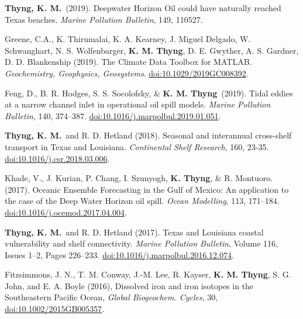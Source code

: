 \documentclass[10pt,letterpaper]{article}
\newcommand{\kmt}{\textbf{K. M. Thyng}}
\newcommand{\tkm}{\textbf{Thyng, K. M.}}
\newcommand{\kt}{\textbf{K. Thyng}}
\renewenvironment{itemize}{
  \begin{list}{}{
    \setlength{\leftmargin}{1.5em}
    \setlength{\itemsep}{0.25em}
    \setlength{\parskip}{0pt}
    \setlength{\parsep}{0.25em}
  }
}{
  \end{list}
}
\begin{document}
\begin{itemize}
\item \tkm~(2019). Deepwater Horizon Oil could have naturally reached Texas beaches. \textit{Marine Pollution Bulletin}, 149, 110527.

\item Greene, C.A.,  K. Thirumalai,  K. A. Kearney,  J. Miguel Delgado,  W. Schwanghart,  N. S. Wolfenbarger,  \kmt,  D. E. Gwyther,  A. S. Gardner,  D. D. Blankenship (2019). The Climate Data Toolbox for MATLAB.  \textit{Geochemistry, Geophysics, Geosystems}. \href{https://agupubs.onlinelibrary.wiley.com/doi/abs/10.1029/2019GC008392}{doi:10.1029/2019GC008392}.

\item Feng, D., B. R. Hodges, S. S. Socolofsky, \& \kmt~(2019). Tidal eddies at a narrow channel inlet in operational oil spill models.  \textit{Marine Pollution Bulletin}, 140, 374--387. \href{https://www.sciencedirect.com/science/article/pii/S0025326X19300712?via%3Dihub}{doi:10.1016/j.marpolbul.2019.01.051}.

\item \tkm~and R. D. Hetland (2018). Seasonal and interannual cross-shelf transport in Texas and Louisiana. \textit{Continental Shelf Research}, 160, 23-35. \href{https://www.sciencedirect.com/science/article/pii/S0278434317302509}{doi:10.1016/j.csr.2018.03.006}.

\item Khade, V., J. Kurian, P. Chang, I. Szunyogh, \kt, \& R. Montuoro. (2017). Oceanic Ensemble Forecasting in the Gulf of Mexico: An application to the case of the Deep Water Horizon oil spill. \textit{Ocean Modelling}, 113, 171--184.  \href{http://www.sciencedirect.com/science/article/pii/S1463500317300525}{doi:10.1016/j.ocemod.2017.04.004}.

\item \tkm~and R. D. Hetland (2017). Texas and Louisiana coastal vulnerability and shelf connectivity. \textit{Marine Pollution Bulletin}, Volume 116, Issues 1--2, Pages 226--233. \href{http://www.sciencedirect.com/science/article/pii/S0025326X16310773}{doi:10.1016/j.marpolbul.2016.12.074}.

\item Fitzsimmons, J. N., T. M. Conway, J.-M. Lee, R. Kayser, \kmt, S. G. John, and E. A. Boyle (2016), Dissolved iron and iron isotopes in the Southeastern Pacific Ocean, \textit{Global Biogeochem. Cycles}, 30,\\ \href{http://onlinelibrary.wiley.com/doi/10.1002/2015GB005357/full}{doi:10.1002/2015GB005357}.


\end{itemize}
\end{document}

